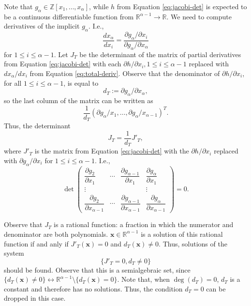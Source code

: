 \documentclass[
]{book}
\theoremstyle{definition}
\theoremstyle{definition}
\theoremstyle{definition}
\theoremstyle{definition}
\theoremstyle{remark}
\begin{document}
Note that \(g_\alpha \in \mathbb{Z}[x_1,\ldots,x_\alpha]\), while \(h\) from Equation \eqref{eq:jacobi-det} is expected to be a continuous differentiable function from \(\mathbb{R}^{\alpha - 1} \to \mathbb{R}\).
We need to compute derivatives of the implicit \(g_\alpha\). I.e.,
\begin{equation}
\dfrac{d x_\alpha}{d x_i} = \dfrac{\partial g_\alpha / \partial x_i}{\partial g_\alpha / \partial x_\alpha}
\label{eq:total-deriv}
\end{equation}
for \(1\le i \le \alpha - 1\).
Let \(J_T\) be the determinant of the matrix of partial derivatives from Equation \eqref{eq:jacobi-det} with each \(\partial h / \partial x_i, 1 \le i \le \alpha - 1\) replaced with \(d x_\alpha / d x_i\) from Equation \eqref{eq:total-deriv}. Observe that the denominator of \(\partial h / \partial x_i\), for all \(1 \le i \le \alpha - 1\), is equal to
\[d_T := \partial g_\alpha / \partial x_\alpha,\]
so the last column of the matrix can be written as
\[
\dfrac{1}{d_T} \left( \partial g_{\alpha} / x_1 , \ldots , \partial g_{\alpha} / x_{\alpha - 1}\right)^T.
\]
Thus, the determinant
\[
J_T = \frac{1}{d_T} J'_T,
\]
where \(J'_T\) is the matrix from Equation \eqref{eq:jacobi-det} with the \(\partial h / \partial x_i\) replaced with \(\partial g_\alpha / \partial x_i\) for \(1\le i \le \alpha - 1\). I.e.,
\begin{equation}
\det\begin{pmatrix}\dfrac{\partial g_{2}}{\partial x_{1}} & \cdots & \dfrac{\partial g_{\alpha-1}}{\partial x_{1}} & \dfrac{\partial g_\alpha}{\partial x_{1}}\\
\vdots &  &  & \vdots\\
\dfrac{\partial g_{2}}{\partial x_{\alpha-1}} & \cdots & \dfrac{\partial g_{\alpha-1}}{\partial x_{\alpha-1}} & \dfrac{\partial g_\alpha}{\partial x_{\alpha-1}}
\end{pmatrix}=0.
\label{eq:jacobi-det-2}
\end{equation}

Observe that \(J_T\) is a rational function: a fraction in which the numerator and denominator are both polynomials. \(\mathbf{x} \in \mathbb{R}^{\alpha - 1}\) is a solution of this rational function if and anly if \(J'_T(\mathbf{x}) = 0\) and \(d_T(\mathbf{x}) \ne 0\). Thus, solutions of the system \[
\{ J'_T = 0, d_T \ne 0 \}
\] should be found.
Observe that this is a semialgebraic set, since
\(\{ d_T(\mathbf{x}) \ne 0 \} \leftrightarrow \mathbb{R}^{\alpha - 1 } \setminus \{ d_T(\mathbf{x}) = 0 \}\).
Note that, when \(\deg(d_T) = 0\), \(d_T\) is a constant and therefore has no solutions. Thus, the condition \(d_T = 0\) can be dropped in this case.
\end{document}
